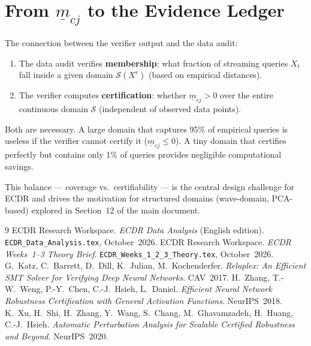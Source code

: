 \documentclass[11pt, a4paper]{article}
\theoremstyle{definition}
\theoremstyle{plain}
\newcommand{\code}[1]{\texttt{#1}}
\newcommand{\mbm}[1]{\underline{m}_{#1}}
\begin{document}
\section{From $\underline{m}_{cj}$ to the Evidence Ledger}

The connection between the verifier output and the data audit:

\begin{enumerate}[leftmargin=2em]
  \item The data audit verifies \textbf{membership}: what fraction of streaming
        queries $X_t$ fall inside a given domain $\mathcal{S}(X^r)$ (based on
        empirical distances).
  \item The verifier computes \textbf{certification}: whether $\mbm{cj} > 0$ over
        the entire continuous domain $\mathcal{S}$ (independent of observed data points).
\end{enumerate}

Both are necessary. A large domain that captures 95\% of empirical queries is
useless if the verifier cannot certify it ($\mbm{cj} \le 0$). A tiny domain
that certifies perfectly but contains only 1\% of queries provides negligible
computational savings.

This balance — coverage vs.\ certifiability — is the central design challenge
for ECDR and drives the motivation for structured domains (wave-domain, PCA-based)
explored in Section~12 of the main document.

\begin{thebibliography}{9}
  ECDR Research Workspace. \textit{ECDR Data Analysis} (English edition).
  \code{ECDR\_Data\_Analysis.tex}, October~2026.
  ECDR Research Workspace. \textit{ECDR Weeks~1--3 Theory Brief}.
  \code{ECDR\_Weeks\_1\_2\_3\_Theory.tex}, October~2026.
  G.~Katz, C.~Barrett, D.~Dill, K.~Julian, M.~Kochenderfer.
  \textit{Reluplex: An Efficient SMT Solver for Verifying Deep Neural Networks}.
  CAV~2017.
  H.~Zhang, T.-W.~Weng, P.-Y.~Chen, C.-J.~Hsieh, L.~Daniel.
  \textit{Efficient Neural Network Robustness Certification with General Activation Functions}.
  NeurIPS~2018.
  K.~Xu, H.~Shi, H.~Zhang, Y.~Wang, S.~Chang, M.~Ghavamzadeh, H.~Huang, C.-J.~Hsieh.
  \textit{Automatic Perturbation Analysis for Scalable Certified Robustness and Beyond}.
  NeurIPS~2020.
\end{thebibliography}
\end{document}
